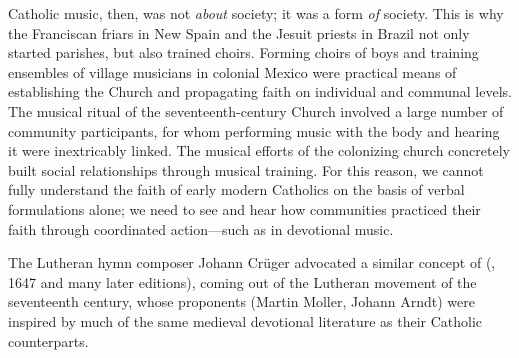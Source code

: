 Catholic music, then, was not \emph{about} society; it was a form \emph{of}
society.
This is why the Franciscan friars in New Spain and the Jesuit priests in Brazil
not only started parishes, but also trained choirs.
Forming choirs of boys and training ensembles of village musicians in colonial
Mexico were practical means of establishing the Church and propagating faith on
individual and communal levels.
The musical ritual of the seventeenth-century Church involved a large number of
community participants, for whom performing music with the body and hearing it
were inextricably linked.
The musical efforts of the colonizing church concretely built social
relationships through musical training.%
    \Autocite{RamosKittrell:PlayingCathedral}
For this reason, we cannot fully understand the faith of early modern Catholics
on the basis of verbal formulations alone; we need to see and hear how
communities practiced their faith through coordinated action---such as in
devotional music.%
\begin{Footnote}
    The Lutheran hymn composer Johann Crüger advocated a similar concept of
     (,
    1647 and many later editions), coming out of the Lutheran 
    movement of the seventeenth century, whose proponents (Martin Moller, Johann
    Arndt) were inspired by much of the same medieval devotional literature as
    their Catholic counterparts.
\end{Footnote}







